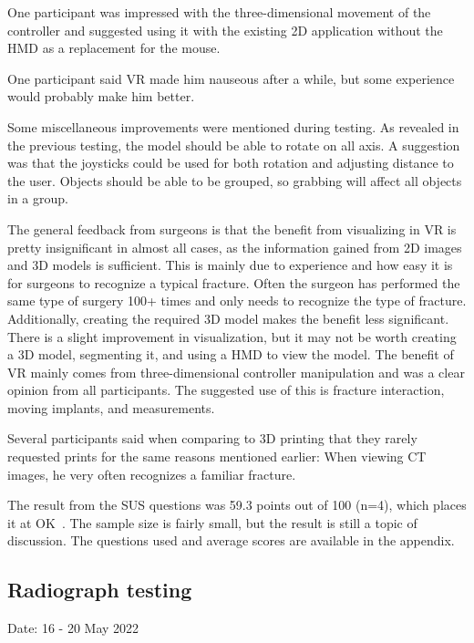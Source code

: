 \documentclass[a4paper]{report}
\begin{document}
One participant was impressed with the three-dimensional movement of the controller and suggested using it with the existing 2D application without the HMD as a replacement for the mouse.

One participant said VR made him nauseous after a while, but some experience would probably make him better.

Some miscellaneous improvements were mentioned during testing. As revealed in the previous testing, the model should be able to rotate on all axis. A suggestion was that the joysticks could be used for both rotation and adjusting distance to the user. Objects should be able to be grouped, so grabbing will affect all objects in a group.


The general feedback from surgeons is that the benefit from visualizing in VR is pretty insignificant in almost all cases, as the information gained from 2D images and 3D models is sufficient.
This is mainly due to experience and how easy it is for surgeons to recognize a typical fracture. Often the surgeon has performed the same type of surgery 100+ times and only needs to recognize the type of fracture. Additionally, creating the required 3D model makes the benefit less significant.
There is a slight improvement in visualization, but it may not be worth creating a 3D model, segmenting it, and using a HMD to view the model.
The benefit of VR mainly comes from three-dimensional controller manipulation and was a clear opinion from all participants. The suggested use of this is fracture interaction, moving implants, and measurements.

Several participants said when comparing to 3D printing that they rarely requested prints for the same reasons mentioned earlier: When viewing CT images, he very often recognizes a familiar fracture.



The result from the SUS questions was 59.3 points out of 100 (n=4), which places it at OK~\cite{bangor_empirical_2008}. The sample size is fairly small, but the result is still a topic of discussion. The questions used and average scores are available in the appendix.

\subsection{Radiograph testing}
Date: 16 - 20 May 2022
\end{document}
